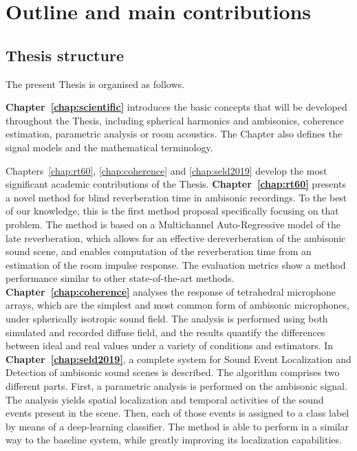 \section{Outline and main contributions}

\subsection{Thesis structure}


The present Thesis is organised as follows. 

\textbf{Chapter~\ref{chap:scientific}} introduces the basic concepts that will be developed throughout the Thesis, including spherical harmonics and ambisonics, coherence estimation, parametric analysis or room acoustics. The Chapter also defines the signal models and the mathematical terminology.

Chapters~\ref{chap:rt60}, \ref{chap:coherence} and \ref{chap:seld2019} develop the most significant academic contributions of the Thesis. 
\textbf{Chapter~\ref{chap:rt60}} presents a novel method for blind reverberation time in ambisonic recordings. To the best of our knowledge, this is the first method proposal specifically focusing on that problem.   The method is based on a Multichannel Auto-Regressive model of the late reverberation, which allows for an effective dereverberation of the ambisonic sound scene, and enables computation of the reverberation time from an estimation of the room impulse response. The evaluation metrics show a method performance similar to other state-of-the-art methods. 
\textbf{Chapter~\ref{chap:coherence}} analyses the response of tetrahedral microphone arrays, which are the simplest and most common form of ambisonic microphones, under spherically isotropic sound field. The analysis is performed using both simulated and recorded diffuse field, and the results quantify the differences between ideal and real values under a variety of conditions and estimators.  
In \textbf{Chapter~\ref{chap:seld2019}}, a complete system for Sound Event Localization and Detection of ambisonic sound scenes is described. The algorithm comprises two different parts. First, a parametric analysis is performed on the ambisonic signal. The analysis yields spatial localization and temporal activities of the sound events present in the scene. Then, each of those events is assigned to a class label by means of a deep-learning classifier. The method is able to perform in a similar way to the baseline system, while greatly improving its localization capabilities.

